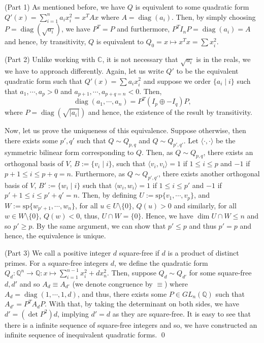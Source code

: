 \documentclass[
]{article}
\theoremstyle{definition}
\theoremstyle{definition}
\begin{document}
(Part 1) As mentioned before, we have \(Q\) is equivalent to some
quadratic form \(Q'(x) = \sum_{i = 1}^n a_i x_i^2 = x^T A x\) where
\(A = \mathop{\mathrm{diag}}(a_i)\). Then, by simply choosing
\(P = \mathop{\mathrm{diag}}(\sqrt{a_i})\), we have \(P^T = P\) and
furthermore, \(P^T I_n P = \mathop{\mathrm{diag}}(a_i) = A\) and hence,
by transitivity, \(Q\) is equivalent to
\(Q_0 = x \mapsto x^T x = \sum x_i^2\).

(Part 2) Unlike working with \(\mathbb{C}\), it is not necessary that
\(\sqrt{a_i}\) is in the reals, we we have to approach differently.
Again, let us write \(Q'\) to be the equivalent quadratic form such that
\(Q'(x) = \sum a_i x_i^2\) and suppose we order \(\{a_i \mid i\}\) such
that \(a_1, \cdots, a_p > 0\) and
\(a_{p + 1}, \cdots, a_{p + q = n} < 0\). Then,
\[\mathop{\mathrm{diag}}(a_1, \cdots, a_n) = P^T (I_p \oplus - I_q) P,\]
where \(P = \mathop{\mathrm{diag}}(\sqrt{\left| a_i \right|})\) and
hence, the existence of the result by transitivity.

Now, let us prove the uniqueness of this equivalence. Suppose otherwise,
then there exists some \(p', q'\) such that \(Q \sim Q_{p, q}\) and
\(Q \sim Q_{p', q'}\). Let \(\langle \cdot, \cdot \rangle\) be the
symmetric bilinear form corresponding to \(Q\). Then, as
\(Q \sim Q_{p, q}\), there exists an orthogonal basis of \(V\),
\(B := \{v_i \mid i\}\), such that \(\langle v_i, v_i \rangle = 1\) if
\(1 \le i \le p\) and \(-1\) if \(p + 1 \le i \le p + q = n\).
Furthermore, as \(Q \sim Q_{p', q'}\), there exists another orthogonal
basis of \(V\), \(B' := \{w_i \mid i\}\) such that
\(\langle w_i, w_i \rangle = 1\) if \(1 \le i \le p'\) and \(-1\) if
\(p' + 1 \le i \le p' + q' = n\). Then, by defining
\(U := \text{sp}\{v_1, \cdots, v_p\}\), and
\(W := \text{sp}\{w_{p' + 1}, \cdots, w_n\}\), for all
\(u \in U \setminus \{0\}\), \(Q(u) > 0\) and similarly, for all
\(w \in W \setminus \{0\}\), \(Q(w) < 0\), thus, \(U \cap W = \{0\}\).
Hence, we have \(\dim U \cap W \le n\) and so \(p' \ge p\). By the same
argument, we can show that \(p' \le p\) and thus \(p' = p\) and hence,
the equivalence is unique.

(Part 3) We call a positive integer \(d\) square-free if \(d\) is a
product of distinct primes. For a square-free integers \(d\), we define
the quadratic form
\(Q_d : \mathbb{Q}^n \to \mathbb{Q} : x \mapsto  \sum_{i = 1}^{n - 1} x_i^2 + dx_n^2\).
Then, suppose \(Q_d \sim Q_{d'}\) for some square-free \(d, d'\) and so
\(A_d \equiv A_{d'}\) (we denote congruence by \(\equiv\)) where
\(A_d = \mathop{\mathrm{diag}}(1, \cdots, 1, d)\), and thus, there
exists some \(P \in GL_n(\mathbb{Q})\) such that \(A_{d'} = P^T A_d P\).
With that, by taking the determinant on both sides, we have
\(d' = (\det P^2) d\), implying \(d' = d\) as they are square-free. It
is easy to see that there is a infinite sequence of square-free integers
and so, we have constructed an infinite sequence of inequivalent
quadratic forms. \qed
\end{document}
